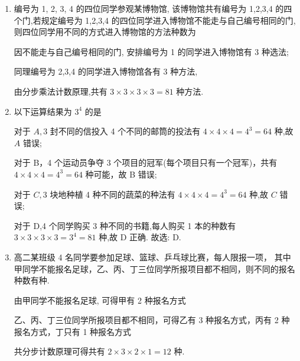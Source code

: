 \begin{enumerate}
\begin{enumerate}
        \item 编号为 1, 2, 3, 4 的四位同学参观某博物馆, 该博物馆共有编号为 1,2,3,4 的四个门,若规定编号为 1,2,3,4 的四位同学进入博物馆不能走与自己编号相同的门, 则四位同学用不同的方式进入博物馆的方法种数为
        \begin{jieda}
            因不能走与自己编号相同的门, 安排编号为 1 的同学进入博物馆有 3 种选法;
            
            同理编号为 2,3,4 的同学进入博物馆各有 3 种方法,
            
            由分步乘法计数原理,共有 $3 \times  3 \times  3 \times  3 = {81}$ 种方法. 
        \end{jieda}
        
        \item 以下运算结果为 ${3}^{4}$ 的是
        \begin{jieda}
            对于 ${A},3$ 封不同的信投入 4 个不同的邮筒的投法有 $4 \times  4 \times  4 = {4}^{3} = {64}$ 种,故 ${A}$ 错误; 
            
            对于 B，4 个运动员争夺 3 个项目的冠军(每个项目只有一个冠军)，共有 $4 \times  4 \times  4 = {4}^{3} = {64}$ 种可能，故 B 错误;
            
            对于 ${C},3$ 块地种植 4 种不同的蔬菜的种法有 $4 \times  4 \times  4 = {4}^{3} = {64}$ 种,故 ${C}$ 错误;
            
            对于 D,4 个同学购买 3 种不同的书籍,每人购买 1 本的种数有 $3 \times  3 \times  3 \times  3 = {3}^{4} = {81}$ 种,故 D 正确. 故选: D.
        \end{jieda}
        
        \item 高二某班级 4 名同学要参加足球、篮球、乒乓球比赛，每人限报一项， 其中甲同学不能报名足球，乙、丙、丁三位同学所报项目都不相同，则不同的报名种数有种.
        \begin{jieda}
            由甲同学不能报名足球, 可得甲有 2 种报名方式
            
            乙、丙、丁三位同学所报项目都不相同，可得乙有 3 种报名方式，丙有 2 种报名方式，丁只有 1 种报名方式
            
            共分步计数原理可得共有 $2 \times  3 \times  2 \times  1 = {12}$ 种.
        \end{jieda}
        

\end{enumerate}
\end{enumerate}

